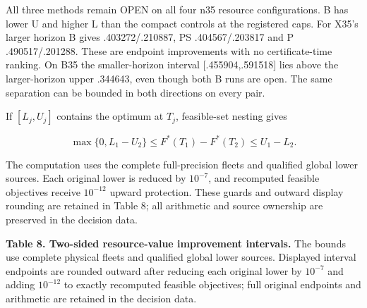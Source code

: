 \documentclass[
  american,
  11pt,
]{article}
\begin{document}
All three methods remain OPEN on all four n35 resource configurations. B
has lower U and higher L than the compact controls at the registered
caps. For X35's larger horizon B gives .403272/.210887, PS
.404567/.203817 and P .490517/.201288. These are endpoint improvements
with no certificate-time ranking. On B35 the smaller-horizon interval
{[}.455904,.591518{]} lies above the larger-horizon upper .344643, even
though both B runs are open. The same separation can be bounded in both
directions on every pair.

If \([L_j,U_j]\) contains the optimum at \(T_j\), feasible-set nesting
gives

\[
\max\{0,L_1-U_2\}\le F^*(T_1)-F^*(T_2)\le U_1-L_2.
\]

The computation uses the complete full-precision fleets and qualified
global lower sources. Each original lower is reduced by \(10^{-7}\), and
recomputed feasible objectives receive \(10^{-12}\) upward protection.
These guards and outward display rounding are retained in Table 8; all
arithmetic and source ownership are preserved in the decision data.

\textbf{Table 8. Two-sided resource-value improvement intervals.} The
bounds use complete physical fleets and qualified global lower sources.
Displayed interval endpoints are rounded outward after reducing each
original lower by \(10^{-7}\) and adding \(10^{-12}\) to exactly
recomputed feasible objectives; full original endpoints and arithmetic
are retained in the decision data.
\end{document}
